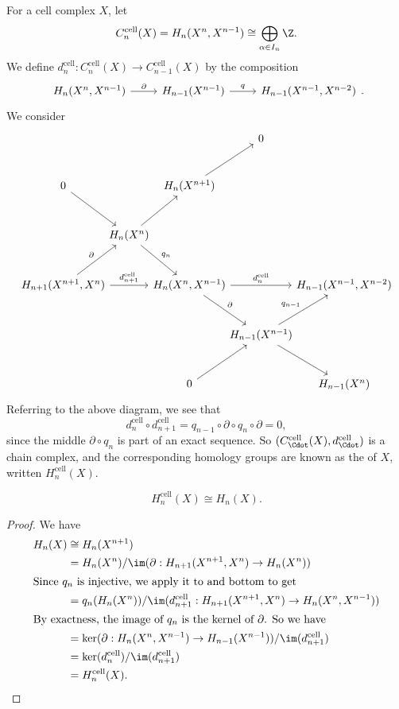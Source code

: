 \documentclass[a4paper]{article}
\theoremstyle{definition}
\begin{document}
For a cell complex $X$, let
\[
  C_n^{\mathrm{cell}}(X) = H_n(X^n, X^{n - 1}) \cong \bigoplus_{\alpha \in I_n} \Z.
\]
We define $d_n^{\mathrm{cell}}: C_n^{\mathrm{cell}}(X) \to C_{n - 1}^{\mathrm{cell}}(X)$ by the composition
\[
  \begin{tikzcd}
    H_n(X^n, X^{n - 1}) \ar[r, "\partial"] & H_{n - 1}(X^{n - 1}) \ar[r, "q"] & H_{n - 1}(X^{n - 1}, X^{n - 2})
  \end{tikzcd}.
\]
We consider
\[
  \begin{tikzcd}[row sep=large, column sep=-0.5em]
    &&& 0\\
    0 \ar[dr] && H_n(X^{n + 1}) \ar[ur]\\
    &H_n(X^n) \ar[ur] \ar[dr, "q_n"]\\
    H_{n + 1}(X^{n + 1}, X^n) \ar[ur, "\partial"] \ar[rr, "d_{n + 1}^{\mathrm{cell}}"] & & H_n(X^n, X^{n - 1}) \ar[rr, "d_n^{\mathrm{cell}}"] \ar[rd, "\partial"] && H_{n - 1}(X^{n - 1}, X^{n - 2})\\
    & & & H_{n - 1}(X^{n - 1}) \ar[rd] \ar[ru, "q_{n - 1}"]\\
    & & 0 \ar[ur] & & H_{n - 1}(X^n)
  \end{tikzcd}
\]
Referring to the above diagram, we see that
\[
  d_n^{\mathrm{cell}} \circ d_{n + 1}^{\mathrm{cell}} = q_{n - 1} \circ \partial \circ q_n \circ \partial = 0,
\]
since the middle $\partial \circ q_n$ is part of an exact sequence. So $(C_{\Cdot}^{\mathrm{cell}}(X), d_{\Cdot}^{\mathrm{cell}})$ is a chain complex, and the corresponding homology groups are known as the  of $X$, written $H_n^{\mathrm{cell}}(X)$.

\begin{thm}
  \[
    H_n^{\mathrm{cell}}(X) \cong H_n(X).
  \]
\end{thm}

\begin{proof}
  We have
  \begin{align*}
    H_n(X) &\cong H_n(X^{n + 1}) \\
    &= H_n(X^n)/\im(\partial: H_{n + 1}(X^{n + 1}, X^n) \to H_n(X^n))\\
    \intertext{Since $q_n$ is injective, we apply it to and bottom to get}
    &= q_n(H_n(X^n)) / \im(d_{n + 1}^{\mathrm{cell}}: H_{n + 1}(X^{n + 1}, X^n) \to H_n(X^n, X^{n - 1}))\\
    \intertext{By exactness, the image of $q_n$ is the kernel of $\partial$. So we have}
    &= \ker(\partial: H_n(X^n, X^{n - 1}) \to H_{n - 1}(X^{n - 1})) / \im(d_{n + 1}^{\mathrm{cell}})\\
    &= \ker(d_n^{\mathrm{cell}}) / \im(d_{n + 1}^{\mathrm{cell}})\\
    &= H_n^{\mathrm{cell}}(X).\qedhere
  \end{align*}
\end{proof}
\end{document}
